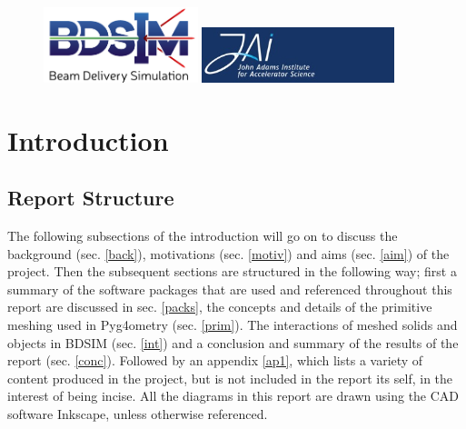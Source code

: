 \documentclass[12pt,a4paper]{article}
\begin{document}
\begin{titlepage}
\begin{figure}[h]
\centering
\begin{minipage}{.6\textwidth}
  \includegraphics[width=0.4\textwidth]{Images//Logos//BDSIM_Logo.jpg}
\end{minipage}%
\begin{minipage}{.6\textwidth}
  \centering
  \includegraphics[width=0.5\textwidth]{Images//Logos//JAI_Logo.jpeg}
  \end{minipage}
\end{figure}

\end{titlepage}
\leavevmode\thispagestyle{empty}\newpage
\tableofcontents
\normalsize
\thispagestyle{empty}
\newpage
\onecolumn

\small
\setcounter{page}{1}


\section{Introduction}

\subsection{Report Structure}
The following subsections of the introduction will go on to discuss the background (sec. \ref{back}), motivations (sec. \ref{motiv}) and aims (sec. \ref{aim}) of the project. Then the subsequent sections are structured in the following way; first a summary of the software packages that are used and referenced throughout this report are discussed in sec. \ref{packs}, the concepts and details of the primitive meshing used in Pyg4ometry (sec. \ref{prim}). The interactions of meshed solids and objects in BDSIM (sec. \ref{int}) and a conclusion and summary of the results of the report (sec. \ref{conc}). Followed by an appendix \ref{ap1}, which lists a variety of content produced in the project, but is not included in the report its self, in the interest of being incise. All the diagrams in this report are drawn using the CAD software Inkscape, unless otherwise referenced.
\end{document}
